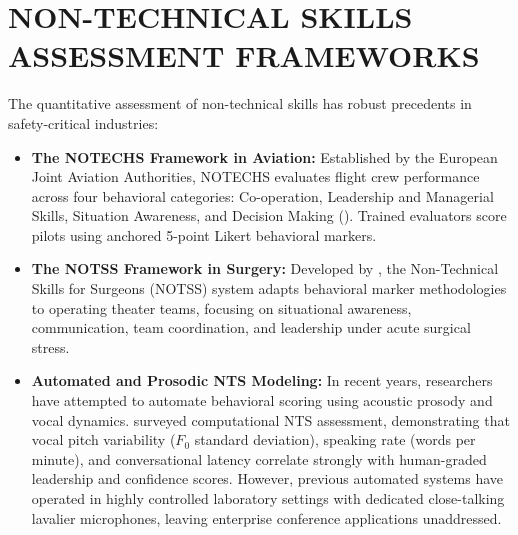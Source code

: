 \documentclass[12pt,a4paper,oneside]{report}
\providecommand{\parencite}[1]{(\cite{#1})}
\providecommand{\textcite}[1]{\cite{#1}}
\begin{document}
\section{NON-TECHNICAL SKILLS ASSESSMENT FRAMEWORKS}
The quantitative assessment of non-technical skills has robust precedents in safety-critical industries:
\begin{itemize}
    \item \textbf{The NOTECHS Framework in Aviation:} Established by the European Joint Aviation Authorities, NOTECHS evaluates flight crew performance across four behavioral categories: Co-operation, Leadership and Managerial Skills, Situation Awareness, and Decision Making \parencite{helmreich2004notechs}. Trained evaluators score pilots using anchored 5-point Likert behavioral markers.
    \item \textbf{The NOTSS Framework in Surgery:} Developed by \textcite{fletcher2003notss}, the Non-Technical Skills for Surgeons (NOTSS) system adapts behavioral marker methodologies to operating theater teams, focusing on situational awareness, communication, team coordination, and leadership under acute surgical stress.
    \item \textbf{Automated and Prosodic NTS Modeling:} In recent years, researchers have attempted to automate behavioral scoring using acoustic prosody and vocal dynamics. \textcite{kumar2022nts} surveyed computational NTS assessment, demonstrating that vocal pitch variability ($F_0$ standard deviation), speaking rate (words per minute), and conversational latency correlate strongly with human-graded leadership and confidence scores. However, previous automated systems have operated in highly controlled laboratory settings with dedicated close-talking lavalier microphones, leaving enterprise conference applications unaddressed.
\end{itemize}
\end{document}
